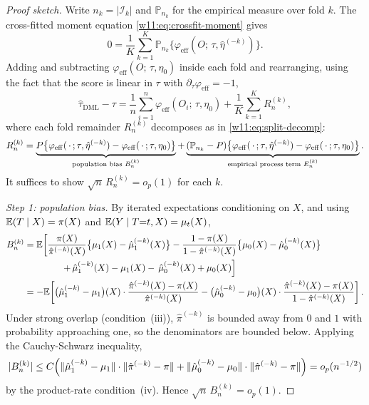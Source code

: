 \documentclass[master.tex]{subfiles}
\begin{document}
\begin{proof}[Proof sketch]
Write $n_k = |\mathcal{I}_k|$ and $\mathbb{P}_{n_k}$ for the
empirical measure over fold $k$.  The cross-fitted moment equation
\eqref{w11:eq:crossfit-moment} gives
\[
  0 = \frac{1}{K}\sum_{k=1}^K \mathbb{P}_{n_k}
      \bigl\{\varphi_{\mathrm{eff}}(O;\,\tau,\hat\eta^{(-k)})\bigr\}.
\]
Adding and subtracting $\varphi_{\mathrm{eff}}(O;\,\tau,\eta_0)$
inside each fold and rearranging, using the fact that the score is
linear in $\tau$ with $\partial_\tau\varphi_{\mathrm{eff}} = -1$,
\[
  \hat\tau_{\mathrm{DML}} - \tau
  =
  \frac{1}{n}\sum_{i=1}^n \varphi_{\mathrm{eff}}(O_i;\,\tau,\eta_0)
  +
  \frac{1}{K}\sum_{k=1}^K R_n^{(k)},
\]
where each fold remainder $R_n^{(k)}$ decomposes as in
\eqref{w11:eq:split-decomp}:
\[
  R_n^{(k)}
  =
  \underbrace{%
    P\bigl\{\varphi_{\mathrm{eff}}(\,\cdot\,;\tau,\hat\eta^{(-k)})
           - \varphi_{\mathrm{eff}}(\,\cdot\,;\tau,\eta_0)\bigr\}
  }_{\text{population bias } B_n^{(k)}}
  +
  \underbrace{%
    (\mathbb{P}_{n_k} - P)\bigl\{\varphi_{\mathrm{eff}}(\,\cdot\,;\tau,\hat\eta^{(-k)})
           - \varphi_{\mathrm{eff}}(\,\cdot\,;\tau,\eta_0)\bigr\}
  }_{\text{empirical process term } E_n^{(k)}}.
\]
It suffices to show $\sqrt{n}\,R_n^{(k)} = o_p(1)$ for each $k$.

\medskip
\noindent\textit{Step 1: population bias.}\enspace
By iterated expectations conditioning on $X$, and using
$\mathbb{E}(T\mid X) = \pi(X)$ and $\mathbb{E}(Y\mid T{=}t, X) = \mu_t(X)$,
\begin{align*}
  B_n^{(k)}
  &= \mathbb{E}\!\left[
      \frac{\pi(X)}{\hat\pi^{(-k)}(X)}\bigl\{\mu_1(X)-\hat\mu_1^{(-k)}(X)\bigr\}
      -
      \frac{1-\pi(X)}{1-\hat\pi^{(-k)}(X)}\bigl\{\mu_0(X)-\hat\mu_0^{(-k)}(X)\bigr\}
    \right.\\
  &\qquad\qquad\left.
      +\,\hat\mu_1^{(-k)}(X)-\mu_1(X)
      -\,\hat\mu_0^{(-k)}(X)+\mu_0(X)
    \right]\\
  &= -\mathbb{E}\!\left[
      \bigl(\hat\mu_1^{(-k)}-\mu_1\bigr)(X)
      \cdot
      \frac{\hat\pi^{(-k)}(X)-\pi(X)}{\hat\pi^{(-k)}(X)}
      -
      \bigl(\hat\mu_0^{(-k)}-\mu_0\bigr)(X)
      \cdot
      \frac{\hat\pi^{(-k)}(X)-\pi(X)}{1-\hat\pi^{(-k)}(X)}
    \right].
\end{align*}
Under strong overlap (condition~(iii)), $\hat\pi^{(-k)}$ is bounded
away from $0$ and $1$ with probability approaching one, so the
denominators are bounded below.  Applying the Cauchy-Schwarz
inequality,
\[
  |B_n^{(k)}|
  \leq
  C\Bigl(
    \|\hat\mu_1^{(-k)} - \mu_1\|\cdot\|\hat\pi^{(-k)}-\pi\|
    +
    \|\hat\mu_0^{(-k)} - \mu_0\|\cdot\|\hat\pi^{(-k)}-\pi\|
  \Bigr)
  = o_p(n^{-1/2})
\]
by the product-rate condition~(iv).  Hence $\sqrt{n}\,B_n^{(k)} =
o_p(1)$.


\end{proof}
\end{document}
